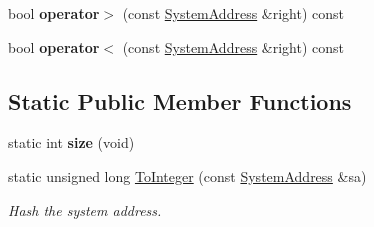 \begin{DoxyCompactItemize}
\item 
\hypertarget{struct_rak_net_1_1_system_address_a2eae48b742d9fc8281116a90a10b7308}{bool {\bfseries operator$>$} (const \hyperlink{struct_rak_net_1_1_system_address}{System\-Address} \&right) const }\label{struct_rak_net_1_1_system_address_a2eae48b742d9fc8281116a90a10b7308}

\item 
\hypertarget{struct_rak_net_1_1_system_address_ab95086fc14b41d761984b92a40364fc9}{bool {\bfseries operator$<$} (const \hyperlink{struct_rak_net_1_1_system_address}{System\-Address} \&right) const }\label{struct_rak_net_1_1_system_address_ab95086fc14b41d761984b92a40364fc9}

\end{DoxyCompactItemize}
\subsection*{Static Public Member Functions}
\begin{DoxyCompactItemize}
\item 
\hypertarget{struct_rak_net_1_1_system_address_a59a568772d7dc36115bcb5a0c0c06874}{static int {\bfseries size} (void)}\label{struct_rak_net_1_1_system_address_a59a568772d7dc36115bcb5a0c0c06874}

\item 
\hypertarget{struct_rak_net_1_1_system_address_aa5bf04e6aec678de997e8458a5790c8d}{static unsigned long \hyperlink{struct_rak_net_1_1_system_address_aa5bf04e6aec678de997e8458a5790c8d}{To\-Integer} (const \hyperlink{struct_rak_net_1_1_system_address}{System\-Address} \&sa)}\label{struct_rak_net_1_1_system_address_aa5bf04e6aec678de997e8458a5790c8d}

\begin{DoxyCompactList}\small\item\em Hash the system address. \end{DoxyCompactList}\end{DoxyCompactItemize}
